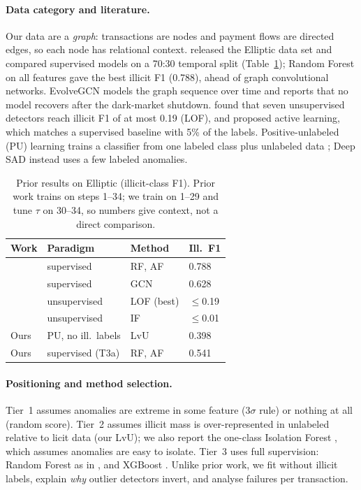 \documentclass[11pt]{article}
\newcommand{\ours}{LvU}
\begin{document}
\paragraph{Data category and literature.}
Our data are a \emph{graph}: transactions are nodes and payment flows are directed edges, so each node has relational context.
\citet{weber2019aml} released the Elliptic data set and compared supervised models on a 70:30 temporal split (Table~\ref{tab:related}); Random Forest on all features gave the best illicit F1 (0.788), ahead of graph convolutional networks.
EvolveGCN \citep{pareja2020evolvegcn} models the graph sequence over time and reports that no model recovers after the dark-market shutdown.
\citet{lorenz2020label} found that seven unsupervised detectors reach illicit F1 of at most 0.19 (LOF), and proposed active learning, which matches a supervised baseline with 5\% of the labels.
Positive-unlabeled (PU) learning trains a classifier from one labeled class plus unlabeled data \citep{elkan2008pu,bekker2020pu}; Deep SAD \citep{ruff2020deepsad} instead uses a few labeled anomalies.

\begin{table}[t]
\centering\small
\setlength{\tabcolsep}{3pt}
\begin{tabular}{@{}llll@{}}
\toprule
Work & Paradigm & Method & Ill.\ F1 \\
\midrule
\citet{weber2019aml} & supervised & RF, AF & 0.788 \\
\citet{weber2019aml} & supervised & GCN & 0.628 \\
\citet{lorenz2020label} & unsupervised & LOF (best) & $\le$0.19 \\
\citet{lorenz2020label} & unsupervised & IF & $\le$0.01 \\
\midrule
Ours & PU, no ill.\ labels & \ours{} & 0.398 \\
Ours & supervised (T3a) & RF, AF & 0.541 \\
\bottomrule
\end{tabular}
\caption{Prior results on Elliptic (illicit-class F1). Prior work trains on steps 1--34; we train on 1--29 and tune $\tau$ on 30--34, so numbers give context, not a direct comparison.}
\label{tab:related}
\end{table}

\paragraph{Positioning and method selection.}
Tier~1 assumes anomalies are extreme in some feature (3$\sigma$ rule) or nothing at all (random score).
Tier~2 assumes illicit mass is over-represented in unlabeled relative to licit data (our \ours{}); we also report the one-class Isolation Forest \citep{liu2008iforest}, which assumes anomalies are easy to isolate.
Tier~3 uses full supervision: Random Forest \citep{breiman2001rf} as in \citet{weber2019aml}, and XGBoost \citep{chen2016xgboost}.
Unlike prior work, we fit without illicit labels, explain \emph{why} outlier detectors invert, and analyse failures per transaction.
\end{document}

